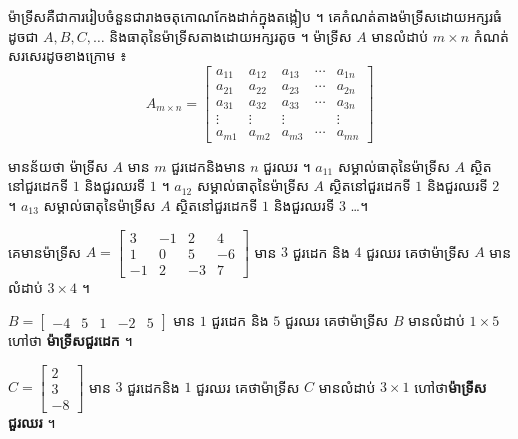 \begin{formulaBox}[ជាទូទៅ]
ម៉ាទ្រីសគឺជាការរៀបចំនួនជារាងចតុកោណកែងដាក់ក្នុងតង្កៀប ។ គេកំណត់តាងម៉ាទ្រីសដោយអក្សរធំ ដូចជា $A, B, C, \ldots$ និងធាតុនៃម៉ាទ្រីសតាងដោយអក្សរតូច ។ ម៉ាទ្រីស $A$ មានលំដាប់ $m \times n$ កំណត់សរសេរដូចខាងក្រោម ៖
\[ A_{m \times n} = \begin{bmatrix} a_{11} & a_{12} & a_{13} & \cdots & a_{1n}\\ a_{21} & a_{22} & a_{23} & \cdots & a_{2n}\\ a_{31} & a_{32} & a_{33} & \cdots & a_{3n}\\ \vdots & \vdots & \vdots & & \vdots\\ a_{m1} & a_{m2} & a_{m3} & \cdots & a_{mn} \end{bmatrix} \]
\end{formulaBox}
មានន័យថា ម៉ាទ្រីស $A$ មាន $m$ ជួរដេកនិងមាន $n$ ជួរឈរ ។ $a_{11}$ សម្គាល់ធាតុនៃម៉ាទ្រីស $A$ ស្ថិតនៅជួរដេកទី $1$ និងជួរឈរទី $1$ ។ $a_{12}$ សម្គាល់ធាតុនៃម៉ាទ្រីស $A$ ស្ថិតនៅជួរដេកទី $1$ និងជួរឈរទី $2$ ។ $a_{13}$ សម្គាល់ធាតុនៃម៉ាទ្រីស $A$ ស្ថិតនៅជួរដេកទី $1$ និងជួរឈរទី $3$ \ldots ។

\begin{example}[ឧទាហរណ៍]
គេមានម៉ាទ្រីស $A = \begin{bmatrix} 3 & -1 & 2 & 4\\ 1 & 0 & 5 & -6\\ -1 & 2 & -3 & 7 \end{bmatrix}$ មាន $3$ ជួរដេក និង $4$ ជួរឈរ គេថាម៉ាទ្រីស $A$ មានលំដាប់ $3 \times 4$ ។

$B = \begin{bmatrix} -4 & 5 & 1 & -2 & 5 \end{bmatrix}$ មាន $1$ ជួរដេក និង $5$ ជួរឈរ គេថាម៉ាទ្រីស $B$ មានលំដាប់ $1 \times 5$ ហៅថា \textbf{ម៉ាទ្រីសជួរដេក} ។

$C = \begin{bmatrix} 2\\ 3\\ -8 \end{bmatrix}$ មាន $3$ ជួរដេកនិង $1$ ជួរឈរ គេថាម៉ាទ្រីស $C$ មានលំដាប់ $3 \times 1$ ហៅថា\textbf{ម៉ាទ្រីសជួរឈរ} ។
\end{example}

